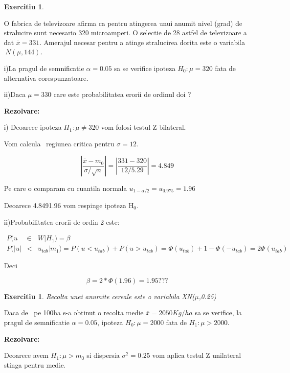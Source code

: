 \documentclass{article}
\newtheorem{exercise}[theorem]{Exercitiu}
\begin{document}
\begin{exercise}
\bigskip
\end{exercise}

O fabrica de televizoare afirma ca pentru atingerea unui anumit nivel (grad)
de stralucire sunt necesario 320 microamperi. O selectie de 28 astfel de
televizoare a dat $\overline{x}=331$. Amerajul necesar pentru a atinge
stralucirea dorita este o variabila $\ N(\mu ,144)$.

i)La pragul de semnificatie $\alpha =0.05$ sa se verifice ipoteza $H_{0}:\mu
=320$ fata de alternativa corespunzatoare.

ii)Daca $\mu =330$ care este probabilitatea erorii de ordinul doi ?

\textbf{Rezolvare:}

i) Deoarece ipoteza $H_{1}:\mu \neq 320$ vom folosi testul Z bilateral.

Vom calcula \ regiunea critica pentru $\sigma =12$.

\[
\left\vert \frac{\overline{x}-m_{0}}{\sigma /\sqrt{n}}\right\vert
=\left\vert \frac{331-320}{12/5.29}\right\vert =4.849 
\]

Pe care o comparam cu cuantila normala $u_{1-\alpha /2}=u_{0.975}=1.96$

Deoarece 4.849\TEXTsymbol{>}1.96 vom respinge ipoteza H$_{0}$.

ii)Probabilitatea erorii de ordin 2 este:

\begin{eqnarray*}
P(u &\in &W|H_{1})=\beta \\
P(|u| &<&u_{tab}|m_{1})=P(u<u_{tab})+P(u>u_{tab})=\Phi (u_{tab})+1-\Phi
(-u_{tab})=2\Phi (u_{tab})
\end{eqnarray*}

Deci

\[
\beta =2\ast \Phi (1.96)=1.95??? 
\]

\begin{exercise}
Recolta unei anumite cereale este o variabila XN($\mu $,0.25)
\end{exercise}

Daca de \ pe 100ha s-a obtinut o recolta medie $\overline{x}=2050Kg/ha$ sa
se verifice, la pragul de semnificatie $\alpha =0.05$, ipoteza $H_{0}:\mu
=2000$ fata de $H_{1}:\mu >2000$.

\textbf{Rezolvare:}

Deoarece avem $H_{1}:\mu >m_{0}$ si dispersia $\sigma ^{2}=0.25$ vom aplica
testul Z unilateral stinga pentru medie.
\end{document}
